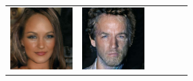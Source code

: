 \documentclass{article}
\newcommand{\pganw}{0.95in}
\begin{document}
\begin{table}[htbp]
\begin{center}
\begin{tabular}{cc|cc|cc}
\includegraphics[width=\pganw]{figures/pgan/61_base_iso_base.jpg} &
\includegraphics[width=\pganw]{figures/pgan/60_base_iso_reject.jpg} &

\end{tabular}
\end{center}
\end{table}
\end{document}
